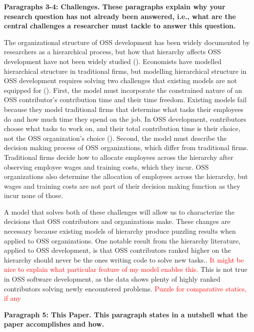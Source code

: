 \documentclass[12pt,notitlepage]{article}
\begin{document}
\textbf{Paragraphs 3-4: Challenges. These paragraphs explain why your research question has not already been answered, i.e., what are the central challenges a researcher must tackle to answer this question.}

\qquad The organizational structure of OSS development has been widely documented by researchers as a hierarchical process, but how that hierarchy affects OSS development have not been widely studied (\cite{crowston_hierarchy_2006}). Economists have modelled hierarchical structure in traditional firms, but modelling hierarchical structure in OSS development requires solving two challenges that existing models are not equipped for (\cite{garicano_hierarchies_2000}). First, the model must incorporate the constrained nature of an OSS contributor's contribution time and their time freedom. Existing models fail because they model traditional firms that determine what tasks their employees do and how much time they spend on the job. In OSS development, contributors choose what tasks to work on, and their total contribution time is their choice, not the OSS organization's choice (\cite{lerner_simple_2002}). Second, the model must describe the decision making process of OSS organizations, which differ from traditional firms. Traditional firms decide how to allocate employees across the hierarchy after observing employee wages and training costs, which they incur. OSS organizations also determine the allocation of employees across the hierarchy, but wages and training costs are not part of their decision making function as they incur none of those. 

\qquad A model that solves both of these challenges will allow us to characterize the decisions that OSS contributors and organizations make. These changes are necessary because existing models of hierarchy produce puzzling results when applied to OSS organizations. One notable result from the hierarchy literature, applied to OSS development, is that OSS contributors ranked higher on the hierarchy should never be the ones writing code to solve new tasks.. \textcolor{red}{It might be nice to explain what particular feature of my model enables this.} This is not true in OSS software development, as the data shows plenty of highly ranked contributors solving newly encountered problems. \textcolor{red}{Puzzle for comparative statics, if any}


\textbf{Paragraph 5: This Paper. This paragraph states in a nutshell what the paper accomplishes and how. }
\end{document}
